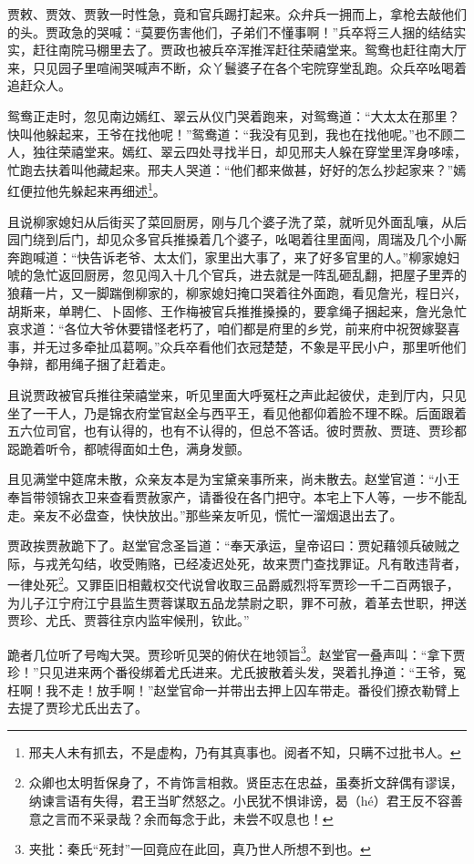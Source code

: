\documentclass[12pt,oneside]{book}
\begin{document}
贾敕、贾效、贾敦一时性急，竟和官兵踢打起来。众弁兵一拥而上，拿枪去敲他们的头。贾政急的哭喊：“莫要伤害他们，子弟们不懂事啊！”兵卒将三人捆的结结实实，赶往南院马棚里去了。贾政也被兵卒浑推浑赶往荣禧堂来。鸳鸯也赶往南大厅来，只见园子里喧闹哭喊声不断，众丫鬟婆子在各个宅院穿堂乱跑。众兵卒吆喝着追赶众人。

鸳鸯正走时，忽见南边嫣红、翠云从仪门哭着跑来，对鸳鸯道：“大太太在那里？快叫他躲起来，王爷在找他呢！”鸳鸯道：“我没有见到，我也在找他呢。”也不顾二人，独往荣禧堂来。嫣红、翠云四处寻找半日，却见邢夫人躲在穿堂里浑身哆嗦，忙跑去扶着叫他藏起来。邢夫人哭道：“他们都来做甚，好好的怎么抄起家来？”嫣红便拉他先躲起来再细述\footnote{邢夫人未有抓去，不是虚构，乃有其真事也。阅者不知，只瞒不过批书人。}。

且说柳家媳妇从后街买了菜回厨房，刚与几个婆子洗了菜，就听见外面乱嚷，从后园门绕到后门，却见众多官兵推搡着几个婆子，吆喝着往里面闯，周瑞及几个小厮奔跑喊道：“快告诉老爷、太太们，家里出大事了，来了好多官里的人。”柳家媳妇唬的急忙返回厨房，忽见闯入十几个官兵，进去就是一阵乱砸乱翻，把屋子里弄的狼藉一片，又一脚踹倒柳家的，柳家媳妇掩口哭着往外面跑，看见詹光，程日兴，胡斯来，单聘仁、卜固修、王作梅被官兵推推搡搡的，要拿绳子捆起来，詹光急忙哀求道：“各位大爷休要错怪老朽了，咱们都是府里的乡党，前来府中祝贺嫁娶喜事，并无过多牵扯瓜葛啊。”众兵卒看他们衣冠楚楚，不象是平民小户，那里听他们争辩，都用绳子捆了赶着走。

且说贾政被官兵推往荣禧堂来，听见里面大呼冤枉之声此起彼伏，走到厅内，只见坐了一干人，乃是锦衣府堂官赵全与西平王，看见他都仰着脸不理不睬。后面跟着五六位司官，也有认得的，也有不认得的，但总不答话。彼时贾赦、贾琏、贾珍都跽跪着听令，都唬得面如土色，满身发颤。

且见满堂中筵席未散，众亲友本是为宝黛亲事所来，尚未散去。赵堂官道：“小王奉旨带领锦衣卫来查看贾赦家产，请番役在各门把守。本宅上下人等，一步不能乱走。亲友不必盘查，快快放出。”那些亲友听见，慌忙一溜烟退出去了。

贾政挨贾赦跪下了。赵堂官念圣旨道：“奉天承运，皇帝诏曰：贾妃藉领兵破贼之际，与戎羌勾结，收受贿赂，已经凌迟处死，故来贾门查找罪证。凡有敢违背者，一律处死\footnote{众卿也太明哲保身了，不肯饰言相救。贤臣志在忠益，虽奏折文辞偶有谬误，纳谏言语有失得，君王当旷然怒之。小民犹不惧诽谤，曷（hé）君王反不容善意之言而不采录哉？余而每念于此，未尝不叹息也！}。又罪臣旧相戴权交代说曾收取三品爵威烈将军贾珍一千二百两银子，为儿子江宁府江宁县监生贾蓉谋取五品龙禁尉之职，罪不可赦，着革去世职，押送贾珍、尤氏、贾蓉往京内监牢候刑，钦此。”

跪者几位听了号啕大哭。贾珍听见哭的俯伏在地领旨\footnote{夹批：秦氏“死封”一回竟应在此回，真乃世人所想不到也。}。赵堂官一叠声叫：“拿下贾珍！”只见进来两个番役绑着尤氏进来。尤氏披散着头发，哭着扎挣道：“王爷，冤枉啊！我不走！放手啊！”赵堂官命一并带出去押上囚车带走。番役们撩衣勒臂上去提了贾珍尤氏出去了。
\end{document}
